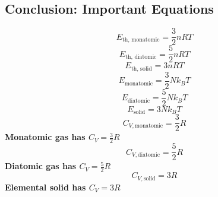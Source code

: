 \documentclass{article}
\begin{document}
\subsection*{Conclusion: Important Equations}
\begin{equation}
E_{\text{th, monatomic}} = \frac{3}{2} nRT
\end{equation}
\begin{equation}
E_{\text{th, diatomic}} = \frac{5}{2} nRT
\end{equation}
\begin{equation}
E_{\text{th, solid}} = 3nRT
\end{equation}
\begin{equation}
E_{\text{monatomic}} = \frac{3}{2} Nk_B T
\end{equation}
\begin{equation}
E_{\text{diatomic}} = \frac{5}{2} Nk_B T
\end{equation}
\begin{equation}
E_{\text{solid}} = 3Nk_B T
\end{equation}
\begin{equation}
C_{V, \text{monatomic}} = \frac{3}{2}R
\end{equation}
\textbf{Monatomic gas has \( C_V = \frac{3}{2}R \)}
\begin{equation}
C_{V, \text{diatomic}} = \frac{5}{2}R
\end{equation}
\textbf{Diatomic gas has \( C_V = \frac{5}{2}R \)}
\begin{equation}
C_{V, \text{solid}} = 3R
\end{equation}
\textbf{Elemental solid has \( C_V = 3R \)}
\end{document}
